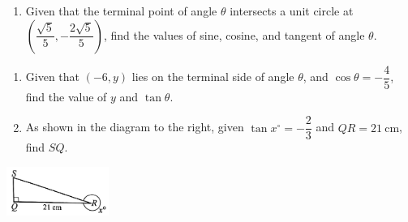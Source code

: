 \documentclass{report}
\begin{document}
\begin{enumerate}
    \item Given that the terminal point of angle \( \theta \) intersects a unit circle at \( \left(\dfrac{\sqrt{5}}{5},-\dfrac{2 \sqrt{5}}{5}\right) \), find the values of sine, cosine, and tangent of angle \( \theta \).
\end{enumerate}
    \begin{vwcol}[widths={0.7,0.3}, sep=0.5cm, rule=0pt]
        \parbox{0.7\textwidth}{
            \begin{enumerate}[start=2]
                \vspace*{-2.4em}
                \item Given that \( (-6, y) \) lies on the terminal side of angle \( \theta \), and \( \cos \theta=-\dfrac{4}{5} \), find the value of \( y \) and \( \tan \theta \).
        
                \item As shown in the diagram to the right, given \( \tan x^{\circ}=-\dfrac{2}{3} \) and \( QR=21 \mathrm{~cm} \), find \( SQ \).
            \end{enumerate}
        }
        
    \includegraphics[width=0.25\textwidth]{assets/9-44.jpg}
    \end{vwcol}
    \vspace{-3.6em}
\end{document}
